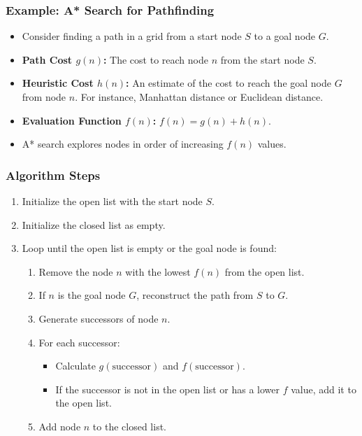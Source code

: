 \documentclass[8pt]{article}
\begin{document}
\subsubsection{Example: A* Search for Pathfinding}
\begin{itemize}
    \item Consider finding a path in a grid from a start node \(S\) to a goal node \(G\).
    \item \textbf{Path Cost \(g(n)\):} The cost to reach node \(n\) from the start node \(S\).
    \item \textbf{Heuristic Cost \(h(n)\):} An estimate of the cost to reach the goal node \(G\) from node \(n\). For instance, Manhattan distance or Euclidean distance.
    \item \textbf{Evaluation Function \(f(n)\):} \(f(n) = g(n) + h(n)\).
    \item A* search explores nodes in order of increasing \(f(n)\) values.
\end{itemize}

\subsubsection{Algorithm Steps}
\begin{enumerate}
    \item Initialize the open list with the start node \(S\).
    \item Initialize the closed list as empty.
    \item Loop until the open list is empty or the goal node is found:
    \begin{enumerate}
        \item Remove the node \(n\) with the lowest \(f(n)\) from the open list.
        \item If \(n\) is the goal node \(G\), reconstruct the path from \(S\) to \(G\).
        \item Generate successors of node \(n\).
        \item For each successor:
        \begin{itemize}
            \item Calculate \(g(\text{successor})\) and \(f(\text{successor})\).
            \item If the successor is not in the open list or has a lower \(f\) value, add it to the open list.
        \end{itemize}
        \item Add node \(n\) to the closed list.
    \end{enumerate}
\end{enumerate}
\end{document}
